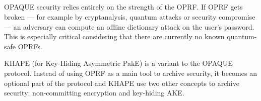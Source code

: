 \documentclass[../report.tex]{subfiles}
\begin{document}



\subsection{}
\paragraph{}

OPAQUE security relies entirely on the strength of the OPRF. If OPRF gets broken --- for example by cryptanalysis, quantum attacks or security compromise --- an adversary can compute an offline dictionary attack on the user's password. This is especially critical considering that there are currently no known quantum-safe OPRFs.

KHAPE (for Key-Hiding Asymmetric PakE) \cite{KHAPE_Paper} is a variant to the OPAQUE protocol. Instead of using OPRF as a main tool to archive security, it becomes an optional part of the protocol and KHAPE use two other concepts to archive security: non-committing encryption and key-hiding AKE. %



\end{document}
